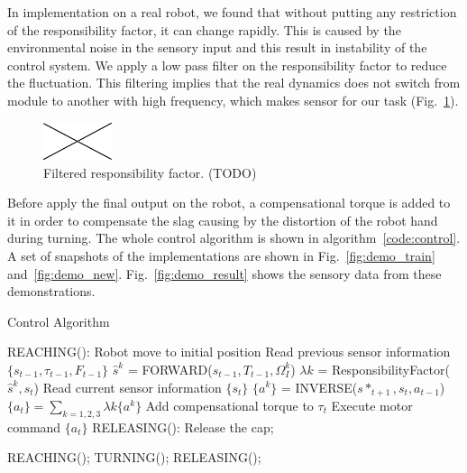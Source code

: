 \documentclass[preprint,12pt]{elsarticle}
\begin{document}
In implementation on a real robot, we found that without putting any restriction of the responsibility factor, it can change rapidly. This is caused by the environmental noise in the sensory input and this result in instability of the control system. We apply a low pass filter on the responsibility factor to reduce the fluctuation. This filtering implies that the real dynamics does not switch from module to another with high frequency, which makes sensor for our task (Fig.~\ref{fig:rf}).


\begin{figure}
  \centering
  \includegraphics[width=2cm]{./fig/void.jpg}
  \caption{ \scriptsize{Filtered responsibility factor. (TODO)}
}
\label{fig:rf}
\end{figure}

Before apply the final output on the robot, a compensational torque is added to it in order to compensate the slag causing by the distortion of the robot hand during turning. The whole control algorithm is shown in algorithm~\ref{code:control}. A set of snapshots of the implementations are shown in Fig.~\ref{fig:demo_train} and~\ref{fig:demo_new}.
Fig.~\ref{fig:demo_result} shows the sensory data from these demonstrations.

\begin{algorithm}
  \caption{Control Algorithm}
  \begin{algorithmic}[1]
    \State REACHING(): Robot move to initial position\;
          \State Read previous sensor information $\{s_{t-1},\tau_{t-1},F_{t-1}\}$\;
            \State $\hat{s}^{k}$ = FORWARD($s_{t-1},T_{t-1},\Omega_I^k$) \;
          \EndFor
            \State $\lambda{k}$ = ResponsibilityFactor($\hat{s}^{k},s_t$) \;
          \EndFor
          \State Read current sensor information $\{s_{t}\}$\;
            \State $\{a^k\}$ = INVERSE($s*_{t+1},s_t,a_{t-1}$) \;
          \EndFor
          \State $\{a_t\} = \sum_{k=1,2,3}\lambda{k}\{a^k\}$\;\;
          \State Add compensational torque to $\tau_t$\;
          \State Execute motor command $\{a_t\}$ \;
          \State RELEASING(): Release the cap;
        \EndFunction
    \EndFor

        \State REACHING();
        \State TURNING();
        \State RELEASING();
    \EndWhile

  \end{algorithmic}
  \label{code:control}
\end{algorithm}
\end{document}
